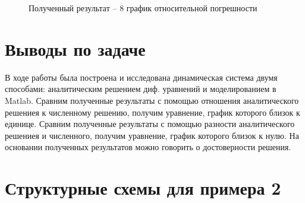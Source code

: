 \documentclass[12pt]{article}
\begin{document}
\begin{figure}[h]
	\caption{Полученный результат --  8 график относительной погрешности}
\end{figure}


	\newpage 
		\clearpage
	\section{Выводы по задаче}
	В ходе работы была построена и исследована динамическая система двумя способами: аналитическим решением диф. уравнений и моделированием в Matlab. Сравним полученные результаты с помощью отношения аналитического решениея к численному решению, получим уравнение, график которого близок к единице. Сравним полученные результаты с помощью разности аналитического решениея и численного, получим уравнение, график которого близок к нулю. На основании полученных результатов можно говорить о достоверности решения. 
	\newpage 
		\clearpage
	\section{Структурные схемы для примера 2}
	
\end{document}
